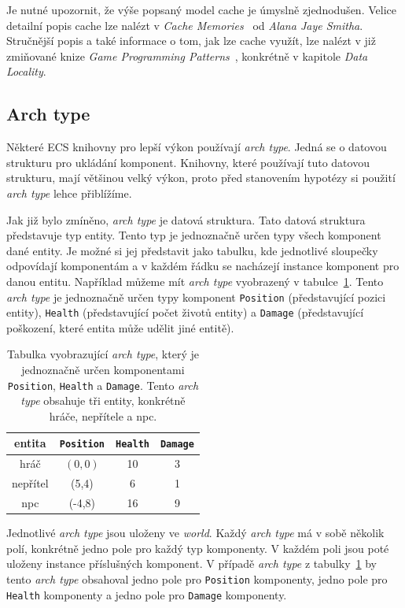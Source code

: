 Je nutné upozornit, že výše popsaný model cache je úmyslně zjednodušen. Velice detailní popis cache lze nalézt v \textit{Cache Memories}~\cite{10.1145/356887.356892} od \textit{Alana Jaye Smitha}. Stručnější popis a také informace o tom, jak lze cache využít, lze nalézt v již zmiňované knize \textit{Game Programming Patterns}~\cite{nystrom2014game}, konkrétně v kapitole \textit{Data Locality}. 

\subsection{Arch type}
Některé ECS knihovny pro lepší výkon používají \textit{arch type}. Jedná se o datovou strukturu pro ukládání komponent. Knihovny, které používají tuto datovou strukturu, mají většinou velký výkon, proto před stanovením hypotézy si použití \textit{arch type} lehce přiblížíme.

Jak již bylo zmíněno, \textit{arch type} je datová struktura. Tato datová struktura představuje typ entity. Tento typ je jednoznačně určen typy všech komponent dané entity. Je možné si jej představit jako tabulku, kde jednotlivé sloupečky odpovídají komponentám a v každém řádku se nacházejí instance komponent pro danou entitu. Například můžeme mít \textit{arch type} vyobrazený v tabulce~\ref{tab:arch-type}. Tento \textit{arch type} je jednoznačně určen typy komponent \texttt{Position} (představující pozici entity), \texttt{Health} (představující počet životů entity) a \texttt{Damage} (představující poškození, které entita může udělit jiné entitě).

\begin{table}[!htb]
    \centering\footnotesize\sf
    \begin{tabular}{c c c c}
        \toprule
        entita & \texttt{Position} & \texttt{Health} & \texttt{Damage} \\
        \midrule
        hráč & $(0,0)$ & 10 & 3 \\
        nepřítel & (5,4) & 6 & 1 \\
        npc & (-4,8) & 16 & 9\\
        \bottomrule
    \end{tabular}
    \caption{Tabulka vyobrazující \textit{arch type}, který je jednoznačně určen komponentami \texttt{Position}, \texttt{Health} a \texttt{Damage}. Tento \textit{arch type} obsahuje tři entity, konkrétně hráče, nepřítele a npc.}
    \label{tab:arch-type}
\end{table}

Jednotlivé \textit{arch type} jsou uloženy ve \textit{world}. Každý \textit{arch type} má v sobě několik polí, konkrétně jedno pole pro každý typ komponenty. V každém poli jsou poté uloženy instance příslušných komponent. V případě \textit{arch type} z tabulky~\ref{tab:arch-type} by tento \textit{arch type} obsahoval jedno pole pro \texttt{Position} komponenty, jedno pole pro \texttt{Health} komponenty a jedno pole pro \texttt{Damage} komponenty.

